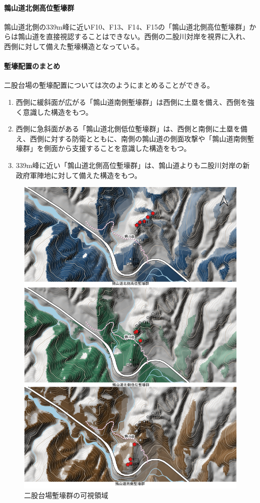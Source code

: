 \documentclass[14Q]{jsarticle}
\begin{document}
\paragraph{鶉山道北側高位塹壕群}
鶉山道北側の339m峰に近いF10、F13、F14、F15の「鶉山道北側高位塹壕群」からは鶉山道を直接視認することはできない。西側の二股川対岸を視界に入れ、西側に対して備えた塹壕構造となっている。

\paragraph{塹壕配置のまとめ}
二股台場の塹壕配置については次のようにまとめることができる。

\begin{enumerate}
\item 西側に緩斜面が広がる「鶉山道南側塹壕群」は西側に土塁を備え、西側を強く意識した構造をもつ。
\item 西側に急斜面がある「鶉山道北側低位塹壕群」は、西側と南側に土塁を備え、西側に対する防衛とともに、南側の鶉山道の側面攻撃や「鶉山道南側塹壕群」を側面から支援することを意識した構造をもつ。
\item 339m峰に近い「鶉山道北側高位塹壕群」は、鶉山道よりも二股川対岸の新政府軍陣地に対して備えた構造をもつ。
\end{enumerate}

\begin{figure}[h]
\centering
\includegraphics[width=160truemm]{fig/view.pdf}
\caption{二股台場塹壕群の可視領域}
\label{view}
\end{figure}
\end{document}

